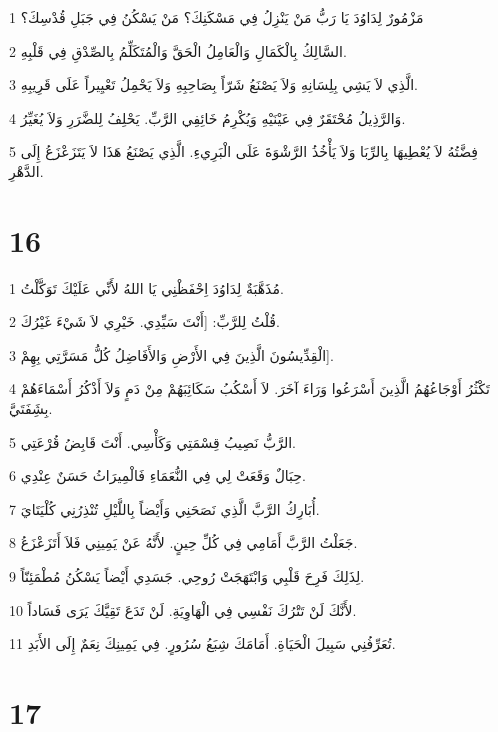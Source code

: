 \par 1 مَزْمُورٌ لِدَاوُدَ يَا رَبُّ مَنْ يَنْزِلُ فِي مَسْكَنِكَ؟ مَنْ يَسْكُنُ فِي جَبَلِ قُدْسِكَ؟
\par 2 السَّالِكُ بِالْكَمَالِ وَالْعَامِلُ الْحَقَّ وَالْمُتَكَلِّمُ بِالصِّدْقِ فِي قَلْبِهِ.
\par 3 الَّذِي لاَ يَشِي بِلِسَانِهِ وَلاَ يَصْنَعُ شَرّاً بِصَاحِبِهِ وَلاَ يَحْمِلُ تَعْيِيراً عَلَى قَرِيبِهِ.
\par 4 وَالرَّذِيلُ مُحْتَقَرٌ فِي عَيْنَيْهِ وَيُكْرِمُ خَائِفِي الرَّبِّ. يَحْلِفُ لِلضَّرَرِ وَلاَ يُغَيِّرُ.
\par 5 فِضَّتُهُ لاَ يُعْطِيهَا بِالرِّبَا وَلاَ يَأْخُذُ الرَّشْوَةَ عَلَى الْبَرِيءِ. الَّذِي يَصْنَعُ هَذَا لاَ يَتَزَعْزَعُ إِلَى الدَّهْرِ.

\chapter{16}

\par 1 مُذَهَّبَةٌ لِدَاوُدَ اِحْفَظْنِي يَا اللهُ لأَنِّي عَلَيْكَ تَوَكَّلْتُ.
\par 2 قُلْتُ لِلرَّبِّ: [أَنْتَ سَيِّدِي. خَيْرِي لاَ شَيْءَ غَيْرُكَ.
\par 3 الْقِدِّيسُونَ الَّذِينَ فِي الأَرْضِ وَالأَفَاضِلُ كُلُّ مَسَرَّتِي بِهِمْ].
\par 4 تَكْثُرُ أَوْجَاعُهُمُ الَّذِينَ أَسْرَعُوا وَرَاءَ آخَرَ. لاَ أَسْكُبُ سَكَائِبَهُمْ مِنْ دَمٍ وَلاَ أَذْكُرُ أَسْمَاءَهُمْ بِشَِفَتَيَّ.
\par 5 الرَّبُّ نَصِيبُ قِسْمَتِي وَكَأْسِي. أَنْتَ قَابِضُ قُرْعَتِي.
\par 6 حِبَالٌ وَقَعَتْ لِي فِي النُّعَمَاءِ فَالْمِيرَاثُ حَسَنٌ عِنْدِي.
\par 7 أُبَارِكُ الرَّبَّ الَّذِي نَصَحَنِي وَأَيْضاً بِاللَّيْلِ تُنْذِرُنِي كُلْيَتَايَ.
\par 8 جَعَلْتُ الرَّبَّ أَمَامِي فِي كُلِّ حِينٍ. لأَنَّهُ عَنْ يَمِينِي فَلاَ أَتَزَعْزَعُ.
\par 9 لِذَلِكَ فَرِحَ قَلْبِي وَابْتَهَجَتْ رُوحِي. جَسَدِي أَيْضاً يَسْكُنُ مُطْمَئِنّاً.
\par 10 لأَنَّكَ لَنْ تَتْرُكَ نَفْسِي فِي الْهَاوِيَةِ. لَنْ تَدَعَ تَقِيَّكَ يَرَى فَسَاداً.
\par 11 تُعَرِّفُنِي سَبِيلَ الْحَيَاةِ. أَمَامَكَ شِبَعُ سُرُورٍ. فِي يَمِينِكَ نِعَمٌ إِلَى الأَبَدِ.

\chapter{17}

